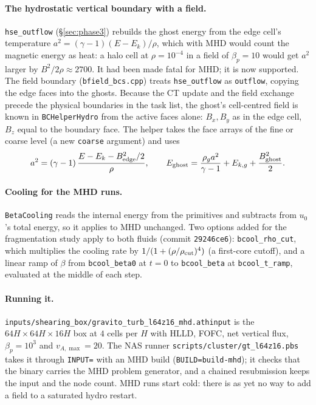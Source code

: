 \documentclass[11pt]{article}
\newcommand{\code}[1]{\texttt{#1}}
\newcommand{\file}[1]{\texttt{\small #1}}
\newcommand{\fn}[1]{\texttt{\small #1}}
\begin{document}
\paragraph{The hydrostatic vertical boundary with a field.} \code{hse\_outflow}
(\S\ref{sec:phase3}) rebuilds the ghost energy from the edge cell's temperature
$a^2 = (\gamma-1)(E - E_k)/\rho$, which with MHD would count the magnetic energy as
heat: a halo cell at $\rho = 10^{-4}$ in a field of $\beta_p = 10$ would get
$a^2$ larger by $B^2/2\rho \approx 2700$. It had been made fatal for MHD; it is now
supported. The field boundary (\file{bfield\_bcs.cpp}) treats \code{hse\_outflow} as
\code{outflow}, copying the edge faces into the ghosts. Because the CT update and the
field exchange precede the physical boundaries in the task list, the ghost's
cell-centred field is known in \fn{BCHelperHydro} from the active faces alone: $B_x, B_y$
as in the edge cell, $B_z$ equal to the boundary face. The helper takes the face arrays of
the fine or coarse level (a new \code{coarse} argument) and uses
\begin{equation}
  a^2 = (\gamma-1)\,\frac{E - E_k - B_{\rm edge}^2/2}{\rho},
  \qquad
  E_{\rm ghost} = \frac{\rho_g a^2}{\gamma - 1} + E_{k,g} + \frac{B_{\rm ghost}^2}{2}.
\end{equation}

\paragraph{Cooling for the MHD runs.} \code{BetaCooling} reads the internal energy from
the primitives and subtracts from $u_0$'s total energy, so it applies to MHD unchanged.
Two options added for the fragmentation study apply to both fluids (commit
\code{29246ce6}): \code{bcool\_rho\_cut}, which multiplies the cooling rate by
$1/(1 + (\rho/\rho_{\rm cut})^4)$ (a first-core cutoff), and a linear ramp of $\beta$ from
\code{bcool\_beta0} at $t = 0$ to \code{bcool\_beta} at \code{bcool\_t\_ramp}, evaluated at
the middle of each step.

\paragraph{Running it.} \file{inputs/shearing\_box/gravito\_turb\_l64z16\_mhd.athinput}
is the $64H\times64H\times16H$ box at $4$ cells per $H$ with HLLD, FOFC, net vertical flux,
$\beta_p = 10^3$ and $v_{A,\max} = 20$. The NAS runner \file{scripts/cluster/gt\_l64z16.pbs}
takes it through \code{INPUT=} with an MHD build (\code{BUILD=build-mhd}); it checks that
the binary carries the MHD problem generator, and a chained resubmission keeps the input
and the node count. MHD runs start cold: there is as yet no way to add a field to a
saturated hydro restart.
\end{document}
